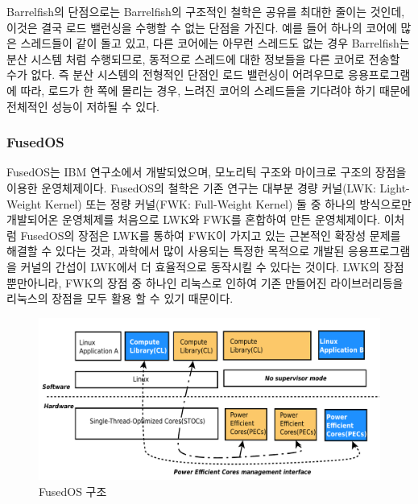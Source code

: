 Barrelfish의 단점으로는 Barrelfish의 구조적인 철학은 공유를 최대한 줄이는 것인데, 
이것은 결국 로드 밸런싱을 수행할 수 없는 단점을 가진다. 
예를 들어 하나의 코어에 많은 스레드들이 같이 돌고 있고, 다른 코어에는 아무런 
스레드도 없는 경우 Barrelfish는 분산 시스템 처럼 수행되므로, 동적으로 스레드에 대한 정보들을 
다른 코어로 전송할 수가 없다.
즉 분산 시스템의 전형적인 단점인 로드 밸런싱이 어려우므로 응용프로그램에 따라,
로드가 한 쪽에 몰리는 경우, 느려진 코어의 스레드들을 기다려야 하기 때문에 전체적인 
성능이 저하될 수 있다. 

\subsubsection{FusedOS}
FusedOS는 IBM 연구소에서 개발되었으며, 모노리틱 구조와 마이크로 구조의 장점을 이용한 운영체제이다.
FusedOS의 철학은 기존 연구는 대부분 경량 커널(LWK: Light-Weight Kernel) 또는 정량 커널(FWK:
Full-Weight Kernel) 둘 중 하나의 방식으로만 개발되어온 운영체제를 처음으로 LWK와 FWK를 
혼합하여 만든 운영체제이다.
이처럼 FusedOS의 장점은 LWK를 통하여 FWK이 가지고 있는 근본적인 확장성 문제를 해결할 수 있다는 것과, 
과학에서 많이 사용되는 특정한 목적으로 개발된 응용프로그램을 커널의 간섭이 LWK에서 더 효율적으로 
동작시킬 수 있다는 것이다. 
LWK의 장점 뿐만아니라, FWK의 장점 중 하나인 리눅스로 인하여 기존 만들어진 라이브러리등을 
리눅스의 장점을 모두 활용 할 수 있기 때문이다.
 
\begin{figure}[h!]
    \centering
    \includegraphics[width=1\textwidth]{fig/fusedos/fusedos}
    \caption{FusedOS 구조}
  \label{fig:FusedOS}
\end{figure}


